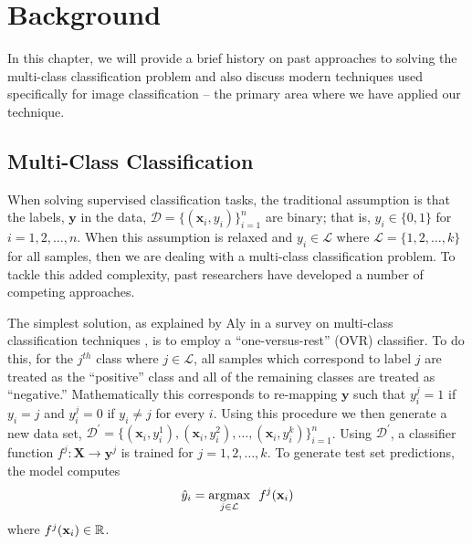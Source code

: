 \documentclass[../thesis.tex]{subfiles}
\begin{document}
\chapter{Background}

In this chapter, we will provide a brief history on past approaches to solving the multi-class classification problem and also discuss modern techniques used specifically for image classification -- the primary area where we have applied our technique.

\section{Multi-Class Classification}
When solving supervised classification tasks, the traditional assumption is that the labels, $\mathbf{y}$ in the data, $\mathcal{D} = \{(\mathbf{x}_i, y_i)\}_{i=1}^n$ are binary; that is, $y_i \in \{0, 1\}$ for $i = 1, 2, \ldots, n$. When this assumption is relaxed and $y_i \in \mathcal{L}$ where $\mathcal{L} = \{1, 2, \ldots, k\}$ for all samples, then we are dealing with a multi-class classification problem. To tackle this added complexity, past researchers have developed a number of competing approaches.

The simplest solution, as explained by Aly in a survey on multi-class classification techniques \cite{aly2005survey}, is to employ a ``one-versus-rest'' (OVR) classifier. To do this, for the $j^{th}$ class where $j \in \mathcal{L}$, all samples which correspond to label $j$ are treated as the ``positive'' class and all of the remaining classes are treated as ``negative.'' Mathematically this corresponds to re-mapping $\mathbf{y}$ such that $y_i^j = 1$ if $y_i = j$ and $y_i^j = 0$ if $y_i \neq j$ for every $i$. Using this procedure we then generate a new data set, $\mathcal{D}^\prime = \{(\mathbf{x}_i, y_i^1), (\mathbf{x}_i, y_i^2), \ldots, (\mathbf{x}_i, y_i^k)\}_{i=1}^n$. Using $\mathcal{D}^\prime$, a classifier function $f^j: \mathbf{X} \rightarrow \mathbf{y}^j$ is trained for $j = 1, 2, \ldots, k.$ To generate test set predictions, the model computes
\begin{equation}
    \label{eq:ovr_pred}
    \hat{y}_i = \underset{j \in \mathcal{L}}{\argmax} \ \  f^j(\mathbf{x}_i)
\end{equation}
where $f^j(\mathbf{x}_i) \in \mathbb{R}$.
\end{document}
